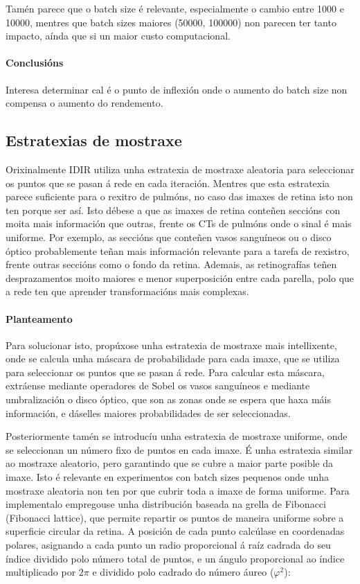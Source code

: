 Tamén parece que o batch size é relevante, especialmente o cambio entre 1000 e 10000, mentres que batch sizes maiores (50000, 100000) non parecen ter tanto impacto, aínda que si un maior custo computacional.

\paragraph{Conclusións}
\label{par:Conclusións}

Interesa determinar cal é o punto de inflexión onde o aumento do batch size non compensa o aumento do rendemento.

\subsection{Estratexias de mostraxe}
\label{subsec:Estratexias de mostraxe}

Orixinalmente IDIR utiliza unha estratexia de mostraxe aleatoria para seleccionar os puntos que se pasan á rede en cada iteración.
Mentres que esta estratexia parece suficiente para o rexitro de pulmóns, no caso das imaxes de retina isto non ten porque ser así.
Isto débese a que as imaxes de retina conteñen seccións con moita mais información que outras, frente os CTs de pulmóns onde o sinal é mais uniforme.
Por exemplo, as seccións que conteñen vasos sanguíneos ou o disco óptico probablemente teñan mais información relevante para a tarefa de rexistro, frente outras seccións como o fondo da retina.
Ademais, as retinografías teñen desprazamentos moito maiores e menor superposición entre cada parella, polo que a rede ten que aprender transformacións mais complexas.

\paragraph{Planteamento}
\label{par:Planteamento}

Para solucionar isto, propúxose unha estratexia de mostraxe mais intellixente, onde se calcula unha máscara de probabilidade para cada imaxe, que se utiliza para seleccionar os puntos que se pasan á rede.
Para calcular esta máscara, extráense mediante operadores de Sobel os vasos sanguíneos e mediante umbralización o disco óptico, que son as zonas onde se espera que haxa máis información, e dáselles maiores probabilidades de ser seleccionadas.

Posteriormente tamén se introducíu unha estratexia de mostraxe uniforme, onde se seleccionan un número fixo de puntos en cada imaxe.
É unha estratexia similar ao mostraxe aleatorio, pero garantindo que se cubre a maior parte posible da imaxe. Isto é relevante en experimentos con batch sizes pequenos onde unha mostraxe aleatoria non ten por que cubrir toda a imaxe de forma uniforme.
Para implementalo empregouse unha distribución baseada na grella de Fibonacci (Fibonacci lattice), que permite repartir os puntos de maneira uniforme sobre a superficie circular da retina. 
A posición de cada punto calcúlase en coordenadas polares, asignando a cada punto un radio proporcional á raíz cadrada do seu índice dividido polo número total de puntos, e un ángulo proporcional ao índice multiplicado por $2\pi$ e dividido polo cadrado do número áureo ($\varphi^2$):

